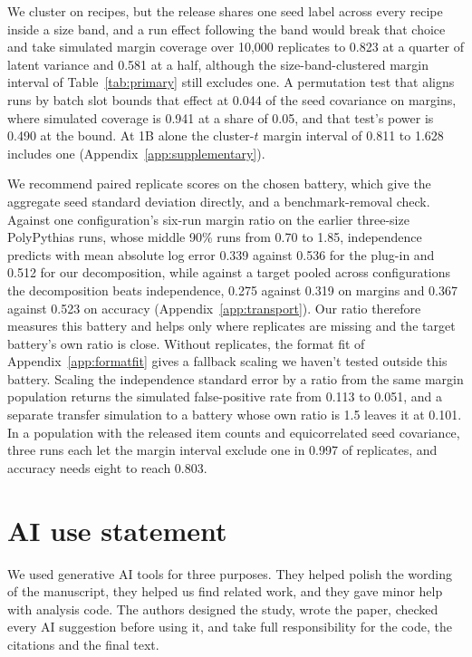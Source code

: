 We cluster on recipes, but the release shares one seed label across every recipe inside a size band, and a run effect following the band would break that choice and take simulated margin coverage over 10,000 replicates to 0.823 at a quarter of latent variance and 0.581 at a half, although the size-band-clustered margin interval  of Table~\ref{tab:primary} still excludes one. A permutation test that aligns runs by batch slot bounds that effect at 0.044 of the seed covariance on margins, where simulated coverage is 0.941 at a share of 0.05, and that test's power is 0.490 at the bound. At 1B alone the cluster-$t$ margin interval of 0.811 to 1.628 includes one (Appendix~\ref{app:supplementary}).

We recommend paired replicate scores on the chosen battery, which give the aggregate seed standard deviation directly, and a benchmark-removal check. Against one configuration's six-run margin ratio on the earlier three-size PolyPythias runs, whose middle 90\% runs from 0.70 to 1.85, independence predicts with mean absolute log error 0.339 against 0.536 for the plug-in and 0.512 for our decomposition, while against a target pooled across configurations the decomposition beats independence, 0.275 against 0.319 on margins and 0.367 against 0.523 on accuracy (Appendix~\ref{app:transport}). Our ratio therefore measures this battery and helps only where replicates are missing and the target battery's own ratio is close. Without replicates, the format fit of Appendix~\ref{app:formatfit} gives a fallback scaling we haven't tested outside this battery. Scaling the independence standard error by a ratio from the same margin population returns the simulated false-positive rate from 0.113 to 0.051, and a separate transfer simulation to a battery whose own ratio is 1.5 leaves it at 0.101. In a population with the released item counts and equicorrelated seed covariance, three runs each let the margin interval exclude one in 0.997 of replicates, and accuracy needs eight to reach 0.803.

\label{maintext:end}
\section*{AI use statement}
We used generative AI tools for three purposes. They helped polish the wording of the manuscript, they helped us find related work, and they gave minor help with analysis code. The authors designed the study, wrote the paper, checked every AI suggestion before using it, and take full responsibility for the code, the citations and the final text.

